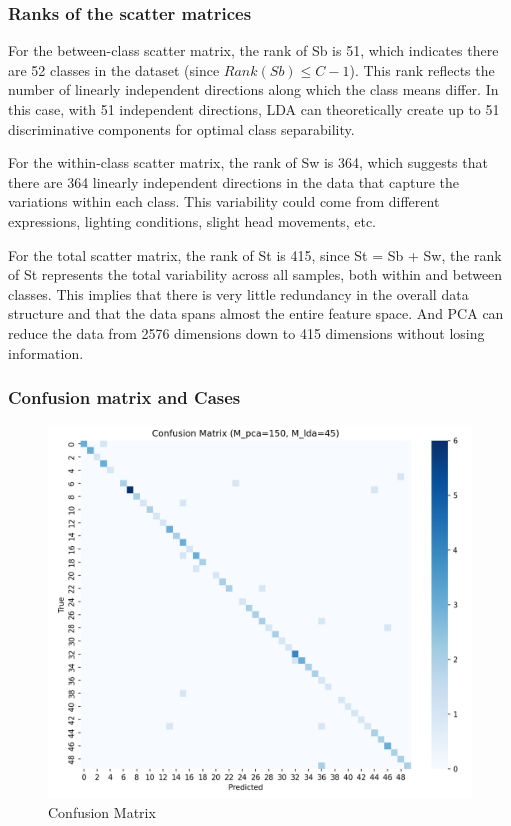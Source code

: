 \subsubsection{Ranks of the scatter matrices}

For the between-class scatter matrix, the rank of Sb is 51, which indicates there are 52 classes in the dataset (since $Rank(Sb)\leq C-1$). This rank reflects the number of linearly independent directions along which the class means differ. In this case, with 51 independent directions, LDA can theoretically create up to 51 discriminative components for optimal class separability.

For the within-class scatter matrix, the rank of Sw is 364, which suggests that there are 364 linearly independent directions in the data that capture the variations within each class. This variability could come from different expressions, lighting conditions, slight head movements, etc.

For the total scatter matrix, the rank of St is 415, since St = Sb + Sw, the rank of St represents the total variability across all samples, both within and between classes. This implies that there is very little redundancy in the overall data structure and that the data spans almost the entire feature space. And PCA can reduce the data from 2576 dimensions down to 415 dimensions without losing information.

\subsubsection{Confusion matrix and Cases}

\begin{figure}[h]
	\centering
	\includegraphics[width=0.8\linewidth]{Ressources/Q3_cm.png}
	
	\caption{Confusion Matrix}
	\label{fig:Q3_cm}
\end{figure}

